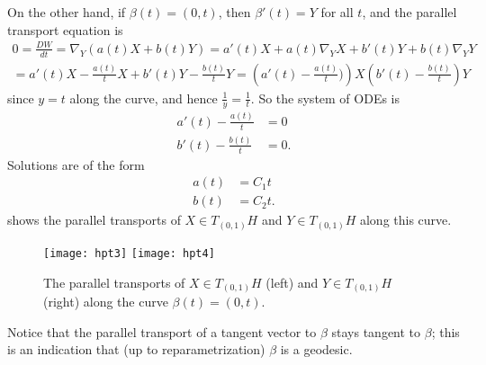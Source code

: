 \begin{example}
	On the other hand, if $\beta(t) = (0,t)$, then $\beta'(t) = Y$ for all $t$, and the parallel transport equation is
	\begin{multline*}
		0 = \frac{DW}{dt} = \nabla_Y (a(t)X + b(t)Y) = a'(t) X + a(t) \nabla_Y X + b'(t)Y + b(t) \nabla_Y Y \\
		= a'(t) X -\frac{a(t)}{t}X + b'(t) Y - \frac{b(t)}{t}Y = \left(a'(t)-\frac{a(t)}{t})\right)X \left(b'(t)-\frac{b(t)}{t}\right)Y
	\end{multline*}
	since $y = t$ along the curve, and hence $\frac{1}{y} = \frac{1}{t}$. So the system of ODEs is
	\begin{align*}
		a'(t)-\frac{a(t)}{t} & = 0 \\
		b'(t)-\frac{b(t)}{t} & = 0.
	\end{align*}
	Solutions are of the form
	\begin{align*}
		a(t) & = C_1t \\
		b(t) & = C_2t.
	\end{align*}
	 shows the parallel transports of $X \in T_{(0,1)}H$ and $Y \in T_{(0,1)}H$ along this curve.
	\begin{figure}[htbp]
		\centering
			\texttt{[image: hpt3]}
			\qquad 
			\texttt{[image: hpt4]}
		\caption{The parallel transports of $X \in T_{(0,1)}H$ (left) and $Y \in T_{(0,1)}H$ (right) along the curve $\beta(t) = (0,t)$.}
		\label{fig:hpt2}
	\end{figure}
	
	Notice that the parallel transport of a tangent vector to $\beta$ stays tangent to $\beta$; this is an indication that (up to reparametrization) $\beta$ is a geodesic.
\end{example}